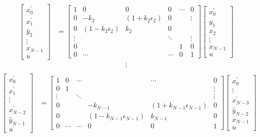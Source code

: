 \documentclass[a4paper,twoside,10pt,english]{article}
\begin{document}
\begin{align*}
\left[\begin{array}{c}
x_{0}^{\prime}\\
x_{1}^{\prime}\\
\hat{y}_{2}\\
\vdots\\
x_{N-1}\\     
u
\end{array}\right] & = \left[\begin{array}{cccccc}
1 & 0 & 0 & 0 & \cdots & 0\\
0 & -k_{2} & \left(1+k_{2}\epsilon_{2}\right) & 0 &  & \vdots\\
0 & \left(1-k_{2}\epsilon_{2}\right) & k_{2} & 0\\
\vdots &  &  & \ddots &  & \vdots\\
0 &  &  &  & 1 & 0\\
0 & \cdots &  & \cdots & 0 & 1
\end{array}\right]\left[\begin{array}{c}
x_{0}^{\prime}\\
\hat{y}_{1}\\
x_{2}\\
\vdots\\
x_{N-1}\\
u
\end{array}\right]
\end{align*}
\begin{align*}
  \vdots\\
\end{align*}
\begin{align*}
\left[\begin{array}{c}
x_{0}^{\prime}\\
x_{1}^{\prime}\\
\vdots\\
x_{N-2}^{\prime}\\
\hat{y}_{N-1}\\
u
\end{array}\right] & = \left[\begin{array}{cccccc}
1 & 0 & \cdots &  & \cdots & 0\\
0 & 1 &  &  &  & \vdots\\
\vdots &  & \ddots &  &  & \vdots\\
0 &  &  & -k_{N-1} & \left(1+k_{N-1}\epsilon_{N-1}\right) & 0\\
0 &  &  & \left(1-k_{N-1}\epsilon_{N-1}\right) & k_{N-1} & 0\\
0 & \cdots & \cdots & 0 & 0 & 1
\end{array}\right]\left[\begin{array}{c}
x_{0}^{\prime}\\
\vdots\\
x_{N-3}^{\prime}\\
\hat{y}_{N-2}\\
x_{N-1}\\
u
\end{array}\right]
\end{align*}
\end{document}
